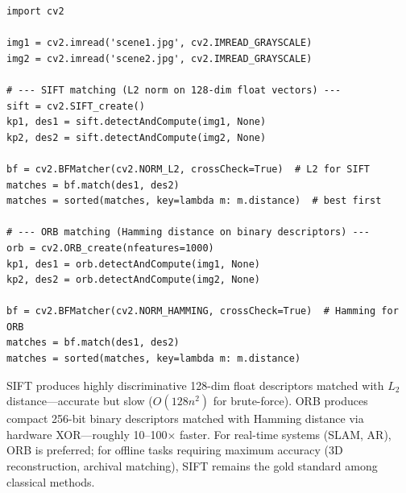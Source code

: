 \begin{lstlisting}[style=pythonstyle]
import cv2

img1 = cv2.imread('scene1.jpg', cv2.IMREAD_GRAYSCALE)
img2 = cv2.imread('scene2.jpg', cv2.IMREAD_GRAYSCALE)

# --- SIFT matching (L2 norm on 128-dim float vectors) ---
sift = cv2.SIFT_create()
kp1, des1 = sift.detectAndCompute(img1, None)
kp2, des2 = sift.detectAndCompute(img2, None)

bf = cv2.BFMatcher(cv2.NORM_L2, crossCheck=True)  # L2 for SIFT
matches = bf.match(des1, des2)
matches = sorted(matches, key=lambda m: m.distance)  # best first

# --- ORB matching (Hamming distance on binary descriptors) ---
orb = cv2.ORB_create(nfeatures=1000)
kp1, des1 = orb.detectAndCompute(img1, None)
kp2, des2 = orb.detectAndCompute(img2, None)

bf = cv2.BFMatcher(cv2.NORM_HAMMING, crossCheck=True)  # Hamming for ORB
matches = bf.match(des1, des2)
matches = sorted(matches, key=lambda m: m.distance)
\end{lstlisting}

\begin{remark}
SIFT produces highly discriminative 128-dim float descriptors matched with $L_2$ distance---accurate but slow ($O(128n^2)$ for brute-force). ORB produces compact 256-bit binary descriptors matched with Hamming distance via hardware XOR---roughly 10--100$\times$ faster. For real-time systems (SLAM, AR), ORB is preferred; for offline tasks requiring maximum accuracy (3D reconstruction, archival matching), SIFT remains the gold standard among classical methods.
\end{remark}
